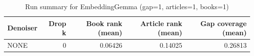 \begin{table}
\caption{Run summary for EmbeddingGemma (gap=1, articles=1, books=1)}
\label{tab:summary_gap1_embeddinggemma_a1_b1}
\begin{tabular}{lrrrr}
\toprule
Denoiser & Drop k & Book rank (mean) & Article rank (mean) & Gap coverage (mean) \\
\midrule
NONE & 0 & 0.06426 & 0.14025 & 0.26813 \\
\bottomrule
\end{tabular}
\end{table}